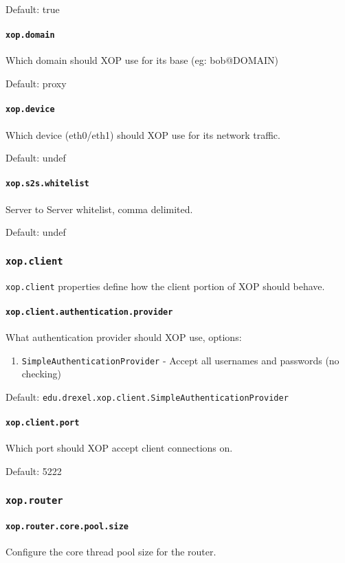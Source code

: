 \documentclass[draft]{article}
\begin{document}
Default: true
\paragraph{\texttt{xop.domain}}
Which domain should XOP use for its base (eg: bob@DOMAIN)

Default: proxy
\paragraph{\texttt{xop.device}}
Which device (eth0/eth1) should XOP use for its network traffic.

Default: undef
\paragraph{\texttt{xop.s2s.whitelist}}
Server to Server whitelist, comma delimited. 

Default: undef
\subsubsection{\texttt{xop.client}}
\texttt{xop.client} properties define how the client portion of XOP should behave.
\paragraph{\texttt{xop.client.authentication.provider}}
What authentication provider should XOP use, options: 
\begin{enumerate}
    \item \texttt{SimpleAuthenticationProvider} -  Accept all usernames and passwords (no checking)
\end{enumerate}

Default: \texttt{edu.drexel.xop.client.SimpleAuthenticationProvider}
\paragraph{\texttt{xop.client.port}}
Which port should XOP accept client connections on. 

Default: 5222
\subsubsection{\texttt{xop.router}}
\paragraph{\texttt{xop.router.core.pool.size}}
Configure the core thread pool size for the router.
\end{document}
